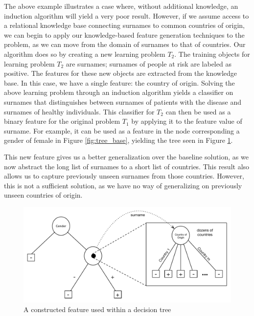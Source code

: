 \documentclass[letterpaper]{article} %
\theoremstyle{definition}
\begin{document}
The above example illustrates a case where, without additional knowledge, an induction algorithm will yield a very poor result. %
However, if we assume access to a relational knowledge base connecting surnames to common countries of origin, we can begin to apply our knowledge-based feature generation techniques to the problem, as we can move from the domain of surnames to that of countries. 
Our algorithm does so by creating a new learning problem $T_2$. The training objects for learning problem $T_2$ are surnames; surnames of people at risk are labeled as positive. The features for these new objects are extracted from the knowledge base. In this case, we have a single feature: the country of origin.
Solving the above learning problem through an induction algorithm yields a classifier on surnames that distinguishes between surnames of patients with the disease and surnames of healthy individuals. This classifier for $T_2$ can then be used as a binary feature for the original problem $T_1$ by applying it to the feature value of surname. For example, it can be used as a feature in the node corresponding a gender of female in Figure \ref{fig:tree_base}, yielding the tree seen in Figure \ref{fig:lvl1_tree}. 

This new feature gives us a better generalization over the baseline solution, as we now abstract the long list of surnames to a short list of countries. %
This result also allows us to capture previously unseen surnames from those countries. However, this is not a sufficient solution, as we have no way of generalizing on previously unseen countries of origin. %


\begin{figure}[h]
	\centering
	\includegraphics[width=0.9\linewidth]{fig2.pdf}
	\caption{A constructed feature used within a decision tree}
	\label{fig:lvl1_tree}
\end{figure}
\end{document}
